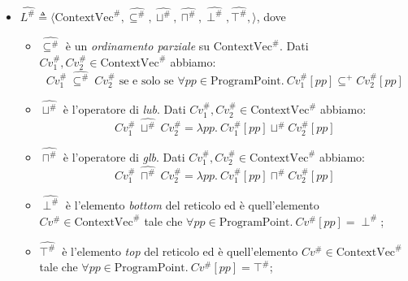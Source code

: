 \documentclass{article}
\newcommand{\cvplus}{\textrm{ContextVec}^+}
\newcommand{\cvsharp}{\textrm{ContextVec}^{\#}}
\begin{document}
\begin{itemize}
\rangle\), 
dove 
\begin{itemize}
	\item \(\widehat{\subseteq^{+}}\) è un \textit{ordinamento parziale} su \(\cvplus\). Dati \(Cv_1^{+}, Cv_2^{+}\in\cvplus\) abbiamo:
	\[Cv_1^{+}\ \widehat{\subseteq^{+}}\ Cv_2^{+}\textrm{ se e solo se }\forall pp\in\textrm{ProgramPoint}.\ Cv_1^{+}[pp] \subseteq^+ Cv_2^{+}[pp]\]
	\item \(\widehat{\sqcup^{+}}\) è l'operatore di \textit{lub}. Dati \(Cv_1^{+}, Cv_2^{+}\in\cvplus\) abbiamo: 
	\[Cv_1^{+}\ \widehat{\sqcup^{+}}\ Cv_2^{+} = \lambda pp.\ Cv_1^{+}[pp] \sqcup^+ Cv_2^{+}[pp]\]
	\item \(\widehat{\sqcap^{+}}\) è l'operatore di \textit{glb}. Dati \(Cv_1^{+}, Cv_2^{+}\in\cvplus\) abbiamo: 
	\[Cv_1^{+}\ \widehat{\sqcap^{+}}\ Cv_2^{+} = \lambda pp.\ Cv_1^{+}[pp] \sqcap^+ Cv_2^{+}[pp]\]
	\item \(\widehat{\perp^{+}}\) è l'elemento \textit{bottom} del reticolo ed è quell'elemento \(Cv^{+}\in\cvplus\) tale che \(\forall pp \in\textrm{ProgramPoint}.\ Cv^{+}[pp] = \perp^+\);
	\item \(\widehat{\top^{+}}\ \) è l'elemento \textit{top} del reticolo ed è quell'elemento \(Cv^{+}\in\cvplus\) tale che \(\forall pp \in\textrm{ProgramPoint}.\ Cv^{+}[pp] = \top^+\);
\end{itemize}
\item 
\( \widehat{L^{\#}}\triangleq
\langle 
	\cvsharp,
	\widehat{\subseteq^{\#}},
	\widehat{\sqcup^{\#}},
	\widehat{\sqcap^{\#}},
	\widehat{\perp^{\#}},
	\widehat{\top^{\#}},
\rangle\), 
dove 
\begin{itemize}
	\item \(\widehat{\subseteq^{\#}}\) è un \textit{ordinamento parziale} su \(\cvsharp\). Dati \(Cv_1^{\#}, Cv_2^{\#}\in\cvsharp\) abbiamo:
	\[Cv_1^{\#}\ \widehat{\subseteq^{\#}}\ Cv_2^{\#}\textrm{ se e solo se }\forall pp\in\textrm{ProgramPoint}.\ Cv_1^{\#}[pp] \subseteq^+ Cv_2^{\#}[pp]\]
	\item \(\widehat{\sqcup^{\#}}\) è l'operatore di \textit{lub}. Dati \(Cv_1^{\#}, Cv_2^{\#}\in\cvsharp\) abbiamo: 
	\[Cv_1^{\#}\ \widehat{\sqcup^{\#}}\ Cv_2^{\#} = \lambda pp.\ Cv_1^{\#}[pp] \sqcup^{\#} Cv_2^{\#}[pp]\]
	\item \(\widehat{\sqcap^{\#}}\) è l'operatore di \textit{glb}. Dati \(Cv_1^{\#}, Cv_2^{\#}\in\cvsharp\) abbiamo: 
	\[Cv_1^{\#}\ \widehat{\sqcap^{\#}}\ Cv_2^{\#} = \lambda pp.\ Cv_1^{\#}[pp] \sqcap^{\#} Cv_2^{\#}[pp]\]
	\item \(\widehat{\perp^{\#}}\) è l'elemento \textit{bottom} del reticolo ed è quell'elemento \(Cv^{\#}\in\cvsharp\) tale che \(\forall pp \in\textrm{ProgramPoint}.\ Cv^{\#}[pp] = \perp^{\#}\);
	\item \(\widehat{\top^{\#}}\ \) è l'elemento \textit{top} del reticolo ed è quell'elemento \(Cv^{\#}\in\cvsharp\) tale che \(\forall pp \in\textrm{ProgramPoint}.\ Cv^{\#}[pp] = \top^{\#}\);
\end{itemize}
\end{itemize}
\end{document}
